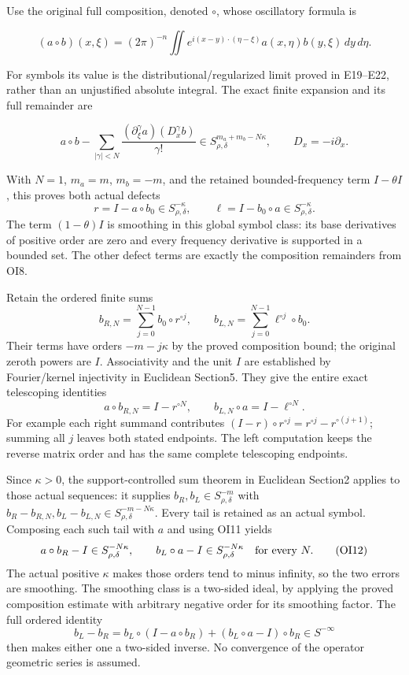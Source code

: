 \documentclass[
  11pt,
]{article}
\begin{document}
Use the original full composition, denoted \(\circ\), whose oscillatory
formula is

\[
(a\circ b)(x,\xi)=(2\pi)^{-n}
\iint e^{i(x-y)\cdot(\eta-\xi)}
           a(x,\eta)b(y,\xi)\,dy\,d\eta .
\tag{OI7}
\]

For symbols its value is the distributional/regularized limit proved in
E19--E22, rather than an unjustified absolute integral. The exact finite
expansion and its full remainder are

\[
a\circ b-\sum_{|\gamma|<N}
\frac{(\partial_\xi^\gamma a)(D_x^\gamma b)}{\gamma!}
\in S^{m_a+m_b-N\kappa}_{\rho,\delta},
\qquad D_x=-i\partial_x .
\tag{OI8}
\]

With \(N=1\), \(m_a=m\), \(m_b=-m\), and the retained bounded-frequency
term \(I-\theta I\), this proves both actual defects \[
r=I-a\circ b_0\in S^{-\kappa}_{\rho,\delta},\qquad
\ell=I-b_0\circ a\in S^{-\kappa}_{\rho,\delta}.
\tag{OI9}
\] The term \((1-\theta)I\) is smoothing in this global symbol class:
its base derivatives of positive order are zero and every frequency
derivative is supported in a bounded set. The other defect terms are
exactly the composition remainders from OI8.

Retain the ordered finite sums \[
b_{R,N}=\sum_{j=0}^{N-1}b_0\circ r^{\circ j},
\qquad
b_{L,N}=\sum_{j=0}^{N-1}\ell^{\circ j}\circ b_0.
\tag{OI10}
\] Their terms have orders \(-m-j\kappa\) by the proved composition
bound; the original zeroth powers are \(I\). Associativity and the unit
\(I\) are established by Fourier/kernel injectivity in Euclidean
Section5. They give the entire exact telescoping identities \[
a\circ b_{R,N}=I-r^{\circ N},\qquad
b_{L,N}\circ a=I-\ell^{\circ N}.
\tag{OI11}
\] For example each right summand contributes
\((I-r)\circ r^{\circ j}=r^{\circ j}-r^{\circ(j+1)}\); summing all \(j\)
leaves both stated endpoints. The left computation keeps the reverse
matrix order and has the same complete telescoping endpoints.

Since \(\kappa>0\), the support-controlled sum theorem in Euclidean
Section2 applies to those actual sequences: it supplies
\(b_R,b_L\in S^{-m}_{\rho,\delta}\) with
\(b_R-b_{R,N},b_L-b_{L,N}\in S^{-m-N\kappa}_{\rho,\delta}\). Every tail
is retained as an actual symbol. Composing each such tail with \(a\) and
using OI11 yields \[
a\circ b_R-I\in S^{-N\kappa}_{\rho,\delta},\qquad
b_L\circ a-I\in S^{-N\kappa}_{\rho,\delta}
\quad\hbox{for every }N.
\tag{OI12}
\] The actual positive \(\kappa\) makes those orders tend to minus
infinity, so the two errors are smoothing. The smoothing class is a
two-sided ideal, by applying the proved composition estimate with
arbitrary negative order for its smoothing factor. The full ordered
identity \[
b_L-b_R
=b_L\circ(I-a\circ b_R)
 +(b_L\circ a-I)\circ b_R
\in S^{-\infty}
\tag{OI13}
\] then makes either one a two-sided inverse. No convergence of the
operator geometric series is assumed.
\end{document}
